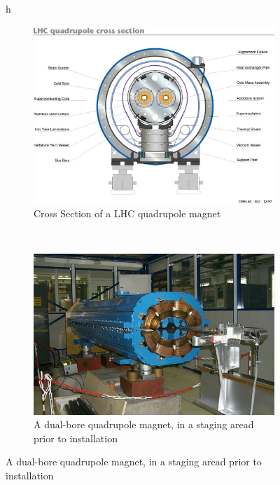\begin{figure}{h}
    \centering
    \begin{subfigure}[h]{0.450\textwidth}
        \includegraphics[width=\textwidth]{Figures/LHC_Diagrams/LHC_Quardupole_Schematic-1998-312.jpg}
        \caption{Cross Section of a LHC quadrupole magnet}\label{fig:lhc_quadrupole_xs}
      \end{subfigure}
      ~ %
    \begin{subfigure}[h]{0.450\textwidth}
        \includegraphics[width=\textwidth]{Figures/LHC_Diagrams/LHC_Quadrupole_TwinMagnets_Staged.jpg}
        \caption{A dual-bore quadrupole magnet, in a staging aread
          prior to installation}\label{fig:lhc_quadrupole_staged}

\end{subfigure}
\end{figure}
